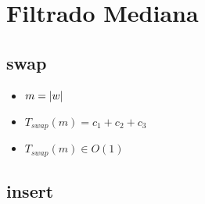 \documentclass{article}
\begin{document}
    \section*{Filtrado Mediana}

    \subsection*{swap}

    \begin{minipage}{0.70\textwidth}
        
    \end{minipage}
    \hfill
    \begin{minipage}{0.25\textwidth}
    \end{minipage}

    \begin{itemize}
        \item $m = |w|$
        \item $T_{swap}(m) = c_1 + c_2 + c_3 $
        \item $T_{swap}(m) \in O(1)$
    \end{itemize}

    \subsection*{insert}

    \begin{minipage}{0.70\textwidth}
        
    \end{minipage}
    \hfill
    \begin{minipage}{0.25\textwidth}
    \end{minipage}
\end{document}
